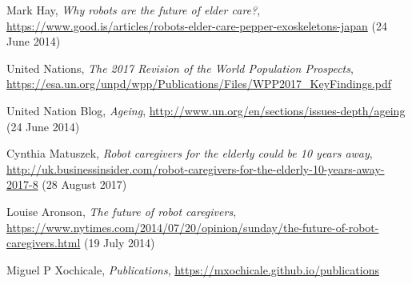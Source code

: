 \documentclass[12pt]{article}
\begin{document}

\begin{thebibliography}{10}

Mark Hay,
{\it Why robots are the future of elder care?},
{\url{https://www.good.is/articles/robots-elder-care-pepper-exoskeletons-japan}} (24 June 2014)


United Nations,
{\it The 2017 Revision of the World Population Prospects},
{\url{https://esa.un.org/unpd/wpp/Publications/Files/WPP2017_KeyFindings.pdf}}


United Nation Blog,
{\it Ageing},
{\url{http://www.un.org/en/sections/issues-depth/ageing}} (24 June 2014)


Cynthia Matuszek,
{\it Robot caregivers for the elderly could be 10 years away},
{\url{http://uk.businessinsider.com/robot-caregivers-for-the-elderly-10-years-away-2017-8}} (28 August 2017)


Louise Aronson,
{\it The future of robot caregivers},
{\url{https://www.nytimes.com/2014/07/20/opinion/sunday/the-future-of-robot-caregivers.html}} (19 July 2014)



Miguel P Xochicale,
{\it Publications},
{\url{https://mxochicale.github.io/publications}}


\end{thebibliography}
\end{document}

